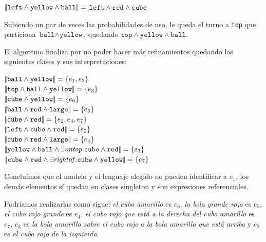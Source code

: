 $|\!|\texttt{left} \wedge \texttt{yellow}\wedge \texttt{ball}|\!| =$
$\texttt{left} \wedge \texttt{red}\wedge \texttt{cube}$

Subiendo un par de veces las probabilidades de uso, le queda el turno a \texttt{top} que particiona $\texttt{ball} \wedge \texttt{yellow}$, quedando $\texttt{top} \wedge \texttt{yellow} \wedge \texttt{ball}$.

El algoritmo finaliza por no poder hacer m\'as refinamientos quedando las siguientes clases y sus interpretaciones:

\noindent
$|\!|\texttt{ball} \wedge \texttt{yellow}|\!| = \{e_1, e_3\}$  \\
$|\!|\texttt{top} \wedge \texttt{ball} \wedge \texttt{yellow}|\!| = \{e_3\}$  \\
$|\!|\texttt{cube} \wedge \texttt{yellow} |\!|= \{e_6\}$ \\
$|\!|\texttt{ball} \wedge \texttt{red} \wedge \texttt{large}|\!| = \{e_5\}$ \\
$|\!|\texttt{cube} \wedge \texttt{red}|\!| = \{e_2, e_4, e_7\}$ \\
$|\!|\texttt{left} \wedge \texttt{cube} \wedge \texttt{red}|\!| = \{e_2\}$ \\
$|\!|\texttt{cube} \wedge \texttt{red} \wedge \texttt{large}|\!| = \{e_4\}$  \\
$|\!|\texttt{yellow} \wedge \texttt{ball} \wedge \exists \mathit{ontop}.\texttt{cube} \wedge \texttt{red}|\!| = \{e_3\}$\\ 
$|\!|\texttt{cube} \wedge \texttt{red} \wedge \exists \mathit{rightof}. \texttt{cube} \wedge \texttt{yellow}|\!| = \{e_7\}$

Conclu\'imos que el modelo y el lenguaje elegido no pueden identificar a $e_1$, los dem\'as elementos s\'i quedan en clases singleton y son expresiones referenciales. 

Podr\'iamos realizarlas como sigue:
{\it el cubo amarillo} es $e_6$, {\it la bola grande roja} es $e_5$, {\it el cubo rojo grande} es $e_4$, {\it el cubo rojo que est\'a a la derecha del cubo amarillo} es $e_7$, $e_3$ es {\it la bola amarilla sobre el cubo rojo} o {\it la bola amarilla que est\'a arriba} y $e_2$ es {\it el cubo rojo de la izquierda}.
 


